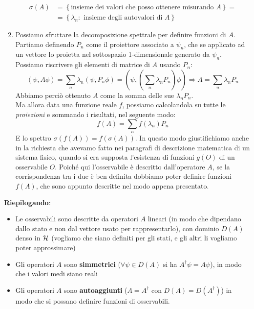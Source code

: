 \documentclass[../../FisicaTeorica.tex]{subfiles}
\begin{document}
\begin{enumerate}
\begin{align*}
	    \sigma \left(A\right)&=\left\{\text {insieme dei valori che posso ottenere misurando } A\right\}= \\
	    &=\left\{\lambda_n:\text{ insieme degli autovalori di } A\right\}
	\end{align*}
\item Possiamo sfruttare la decomposizione spettrale per definire funzioni di $A$.\\
Partiamo definendo $P_n$ come il proiettore associato a $\psi_n$, che se applicato ad un vettore lo proietta nel sottospazio 1-dimensionale generato da $\psi_n$. Possiamo riscrivere gli elementi di matrice di $A$ usando $P_n$:
	\[
	\left(\psi, A\phi\right)=\sum_{n}{\lambda_n\left(\psi,P_n\phi\right)}=\left(\psi, \left(\sum_{n}{\lambda_n P_n}\right)\phi\right) \Rightarrow A=\sum_{n}{\lambda_n P_n}
	\]
	Abbiamo perciò ottenuto $A$ come la somma delle sue  $\lambda_n P_n$.\\
	Ma allora data una funzione reale $f$, possiamo 
	calcolandola su tutte le \textit{proiezioni} e sommando i risultati, nel seguente modo:
	\begin{equation}
	f\left(A\right)=\sum_{n}{f\left(\lambda_n\right)P_n}
	\label{eqn:funzioniop}
	\end{equation}
	E lo spettro $\sigma \left(f\left(A\right)\right)=f(\sigma \left(A\right))$. 
	In questo modo giustifichiamo anche in \MQ la richiesta che avevamo fatto nei paragrafi di descrizione matematica di un sistema fisico, quando si era supposta l'esistenza di funzioni $g(O)$ di un osservabile $O$. Poiché qui l'osservabile è descritto dall'operatore $A$, se la corrispondenza tra i due è ben definita dobbiamo poter definire funzioni $f(A)$, che sono appunto descritte nel modo appena presentato.
\end{enumerate}

\textbf{Riepilogando}:
\begin{itemize}
    \item Le osservabili sono descritte da operatori $A$ lineari (in modo che dipendano dallo stato e non dal vettore usato per rappresentarlo), con dominio $D(A)$ denso in $\mathcal{H}$ (vogliamo che siano definiti per  gli stati, e gli altri li vogliamo poter approssimare) %
    \item Gli operatori $A$ sono \textbf{simmetrici} ($\forall \psi \in D(A)$ si ha $A^\dag \psi = A\psi$), in modo che i valori medi siano reali
    \item Gli operatori $A$ sono \textbf{autoaggiunti} ($A = A^\dag$ con $D(A) = D(A^\dag)$) in modo che si possano definire funzioni di osservabili.
\end{itemize}
\end{document}
